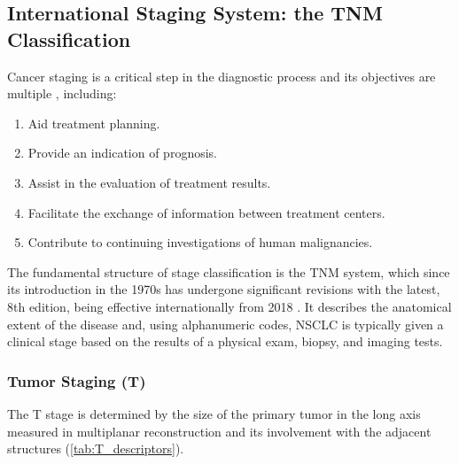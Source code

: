 \subsection{International Staging System: the TNM Classification}

Cancer staging is a critical step in the diagnostic process and its objectives are multiple \cite{TNM}, including:
\begin{enumerate}
    \item Aid treatment planning.
    \item Provide an indication of prognosis.
    \item Assist in the evaluation of treatment results.
    \item Facilitate the exchange of information between treatment centers.
    \item Contribute to continuing investigations of human malignancies.
\end{enumerate}

The fundamental structure of stage classification is the TNM system, which since its introduction in the 1970s has undergone significant revisions with the latest, 8th edition, being effective internationally from 2018 \cite{TNM_8th}. It describes the anatomical extent of the disease and, using alphanumeric codes, NSCLC is typically given a clinical stage based on the results of a physical exam, biopsy, and imaging tests.

\subsubsection{Tumor Staging (T)}

The T stage is determined by the size of the primary tumor in the long axis measured in multiplanar reconstruction and its involvement with the adjacent structures (\autoref{tab:T_descriptors}).


